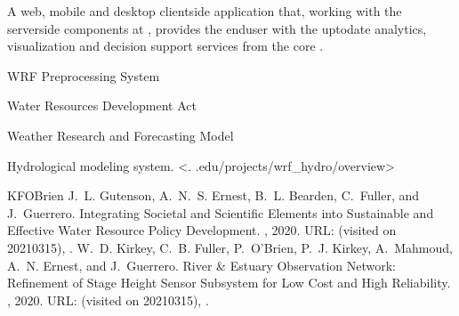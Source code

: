 \documentclass[letterpaper,12pt,english,openany,oneside]{sphinxmanual}
\begin{document}
\begin{description}
\sphinxAtStartPar
A web, mobile and desktop client\sphinxhyphen{}side application that, working with the server\sphinxhyphen{}side components at {\hyperref[\detokenize{glossary:term-RGVFlood.com}]{}}, provides the end\sphinxhyphen{}user with the up\sphinxhyphen{}to\sphinxhyphen{}date analytics, visualization and decision support services from the core {\hyperref[\detokenize{glossary:term-REON.cc}]{}} {\hyperref[\detokenize{glossary:term-CI}]{}}.

\sphinxAtStartPar
WRF Preprocessing System

\sphinxAtStartPar
Water Resources Development Act

\sphinxAtStartPar
Weather Research and Forecasting Model

\sphinxAtStartPar
{\hyperref[\detokenize{glossary:term-WRF}]{}} Hydrological modeling system.   \textless{}.
.edu/projects/wrf\_hydro/overview\textgreater{}

\end{description}

\begin{sphinxthebibliography}{KFOBrien}
\sphinxAtStartPar
J. L. Gutenson, A. N. S. Ernest, B. L. Bearden, C. Fuller, and J. Guerrero. Integrating Societal and Scientific Elements into Sustainable and Effective Water Resource Policy Development. , 2020. URL:  (visited on 2021\sphinxhyphen{}03\sphinxhyphen{}15), .
\sphinxAtStartPar
W. D. Kirkey, C. B. Fuller, P. O’Brien, P. J. Kirkey, A. Mahmoud, A. N. Ernest, and J. Guerrero. River \& Estuary Observation Network: Refinement of Stage Height Sensor Subsystem for Low Cost and High Reliability. , 2020. URL:  (visited on 2021\sphinxhyphen{}03\sphinxhyphen{}15), .
\end{sphinxthebibliography}



\renewcommand{\indexname}{Index}
\printindex
\end{document}
